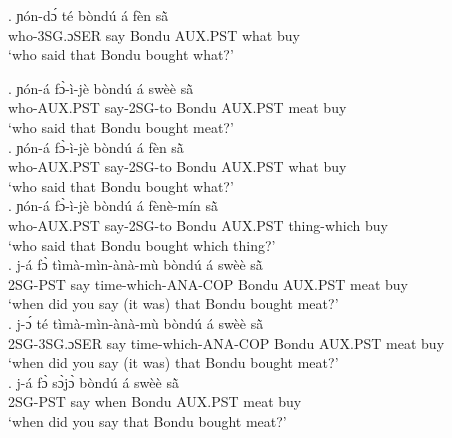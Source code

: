 \documentclass{assets/fieldnotes}
\begin{document}
\exg. ɲón-dɔ́ té bòndú á fèn sã̀\\
who-3SG.ɔSER say Bondu AUX.PST what buy\\
`who said that Bondu bought what?' \\


\exg. ɲón-á fɔ̀-ì-jè bòndú á swèè sã̀\\
who-AUX.PST say-2SG-to Bondu AUX.PST meat buy\\
`who said that Bondu bought meat?' \\

\exg. ɲón-á fɔ̀-ì-jè bòndú á fèn sã̀\\
who-AUX.PST say-2SG-to Bondu AUX.PST what buy\\
`who said that Bondu bought what?' \\

\exg. ɲón-á fɔ̀-ì-jè bòndú á fènè-mín sã̀\\
who-AUX.PST say-2SG-to Bondu AUX.PST thing-which buy\\
`who said that Bondu bought which thing?' \\

\exg. j-á fɔ̀ tìmà-mìn-ànà-mù bòndú á swèè sã̀ \\
2SG-PST say time-which-ANA-COP Bondu AUX.PST meat buy\\
`when did you say (it was) that Bondu bought meat?' \\

\exg. j-ɔ́ té tìmà-mìn-ànà-mù bòndú á swèè sã̀ \\
2SG-3SG.ɔSER say time-which-ANA-COP Bondu AUX.PST meat buy\\
`when did you say (it was) that Bondu bought meat?' \\

\exg. j-á fɔ̀ sɔ̀jɔ̀ bòndú á swèè sã̀ \\
2SG-PST say when Bondu AUX.PST meat buy\\
`when did you say that Bondu bought meat?' \\
\end{document}
